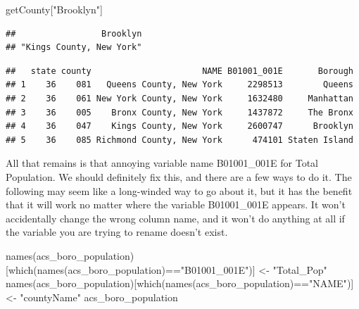 \documentclass[
  openany]{book}
\newenvironment{Shaded}{\begin{snugshade}}{\end{snugshade}}
\newcommand{\FunctionTok}[1]{\textcolor[rgb]{0.00,0.00,0.00}{#1}}
\newcommand{\NormalTok}[1]{#1}
\newcommand{\OtherTok}[1]{\textcolor[rgb]{0.56,0.35,0.01}{#1}}
\newcommand{\SpecialCharTok}[1]{\textcolor[rgb]{0.00,0.00,0.00}{#1}}
\newcommand{\StringTok}[1]{\textcolor[rgb]{0.31,0.60,0.02}{#1}}
\begin{document}
\begin{Shaded}
\begin{Highlighting}[]
\NormalTok{getCounty[}\StringTok{"Brooklyn"}\NormalTok{]}
\end{Highlighting}
\end{Shaded}

\begin{verbatim}
##                 Brooklyn
## "Kings County, New York"
\end{verbatim}

\begin{Shaded}
\end{Shaded}

\begin{verbatim}
##   state county                      NAME B01001_001E       Borough
## 1    36    081   Queens County, New York     2298513        Queens
## 2    36    061 New York County, New York     1632480     Manhattan
## 3    36    005    Bronx County, New York     1437872     The Bronx
## 4    36    047    Kings County, New York     2600747      Brooklyn
## 5    36    085 Richmond County, New York      474101 Staten Island
\end{verbatim}

All that remains is that annoying variable name B01001\_001E for Total Population. We should definitely fix this, and there are a few ways to do it. The following may seem like a long-winded way to go about it, but it has the benefit that it will work no matter where the variable B01001\_001E appears. It won't accidentally change the wrong column name, and it won't do anything at all if the variable you are trying to rename doesn't exist.

\begin{Shaded}
\begin{Highlighting}[]
\FunctionTok{names}\NormalTok{(acs\_boro\_population)[}\FunctionTok{which}\NormalTok{(}\FunctionTok{names}\NormalTok{(acs\_boro\_population)}\SpecialCharTok{==}\StringTok{"B01001\_001E"}\NormalTok{)] }\OtherTok{\textless{}{-}} \StringTok{"Total\_Pop"}
\FunctionTok{names}\NormalTok{(acs\_boro\_population)[}\FunctionTok{which}\NormalTok{(}\FunctionTok{names}\NormalTok{(acs\_boro\_population)}\SpecialCharTok{==}\StringTok{"NAME"}\NormalTok{)] }\OtherTok{\textless{}{-}} \StringTok{"countyName"}
\NormalTok{acs\_boro\_population}
\end{Highlighting}
\end{Shaded}
\end{document}
